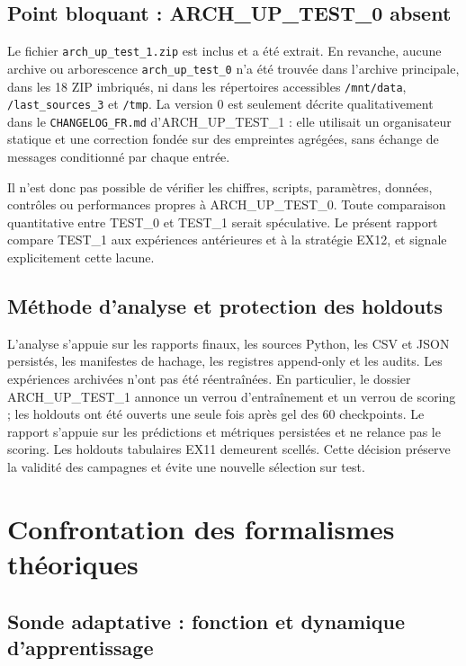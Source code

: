 \documentclass[11pt,a4paper]{article}
\newcommand{\code}[1]{\texttt{\small #1}}
\begin{document}
\subsection{Point bloquant : ARCH\_UP\_TEST\_0 absent}

Le fichier \code{arch\_up\_test\_1.zip} est inclus et a été extrait. En revanche, aucune archive ou arborescence \code{arch\_up\_test\_0} n'a été trouvée dans l'archive principale, dans les 18 ZIP imbriqués, ni dans les répertoires accessibles \code{/mnt/data}, \code{/last\_sources\_3} et \code{/tmp}. La version 0 est seulement décrite qualitativement dans le \code{CHANGELOG\_FR.md} d'ARCH\_UP\_TEST\_1 : elle utilisait un organisateur statique et une correction fondée sur des empreintes agrégées, sans échange de messages conditionné par chaque entrée.

Il n'est donc pas possible de vérifier les chiffres, scripts, paramètres, données, contrôles ou performances propres à ARCH\_UP\_TEST\_0. Toute comparaison quantitative entre TEST\_0 et TEST\_1 serait spéculative. Le présent rapport compare TEST\_1 aux expériences antérieures et à la stratégie EX12, et signale explicitement cette lacune.

\subsection{Méthode d'analyse et protection des holdouts}

L'analyse s'appuie sur les rapports finaux, les sources Python, les CSV et JSON persistés, les manifestes de hachage, les registres append-only et les audits. Les expériences archivées n'ont pas été réentraînées. En particulier, le dossier ARCH\_UP\_TEST\_1 annonce un verrou d'entraînement et un verrou de scoring ; les holdouts ont été ouverts une seule fois après gel des 60 checkpoints. Le rapport s'appuie sur les prédictions et métriques persistées et ne relance pas le scoring. Les holdouts tabulaires EX11 demeurent scellés. Cette décision préserve la validité des campagnes et évite une nouvelle sélection sur test.

\section{Confrontation des formalismes théoriques}

\subsection{Sonde adaptative : fonction et dynamique d'apprentissage}
\end{document}
